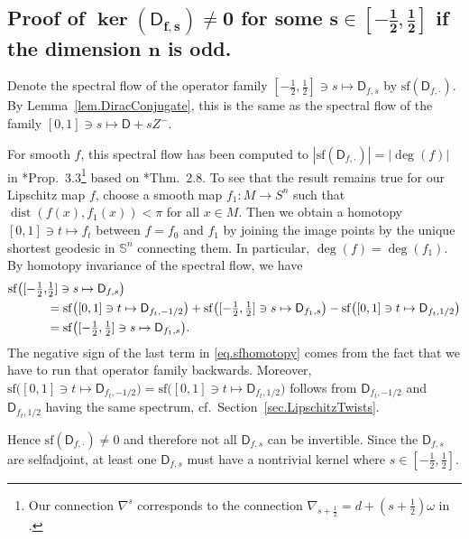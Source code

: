 \documentclass[11pt,reqno]{amsart}
\newcommand{\ns}{\nabla^s}
\renewcommand{\sf}{\mathrm{sf}}
\newcommand{\Sn}{\mathbb{S}^n}
\newcommand{\D}{\mathsf{D}}
\newcommand{\<}{\langle}
\renewcommand{\>}{\rangle}
\DeclareMathOperator{\dist}{\mathrm{dist}}
\theoremstyle{definition}
\begin{document}
\subsection{\texorpdfstring{Proof of $\boldsymbol{\ker(\D_{f,s})\ne0}$ for some $\boldsymbol{s\in[-\frac12,\frac12]}$ if the dimension $\boldsymbol{n}$ is odd.}{Proof of ker(Df,s)≠0 for some s∈[-½,½] if the dimension n is odd}}
\label{subsec.proof.spectralflow}
Denote the spectral flow of the operator family $[-\frac12,\frac12]\ni s\mapsto \D_{f,s}$ by $\sf(\D_{f,\cdot})$.
By Lemma~\ref{lem.DiracConjugate}, this is the same as the spectral flow of the family $[0,1]\ni s\mapsto \D + sZ^-$.

For smooth $f$, this spectral flow has been computed to $|\sf(\D_{f,\cdot})|=|\deg(f)|$ in \cite{LSW}*{Prop.~3.3}\footnote{Our connection $\ns$ corresponds to the connection $\nabla_{s+\frac12}=d+(s+\frac12)\omega$ in \cite{LSW}.} based on \cite{G}*{Thm.~2.8}.
To see that the result remains true for our Lipschitz map $f$, choose a smooth map $f_1\colon M\to S^n$ such that $\dist(f(x),f_1(x))<\pi$ for all $x\in M$.
Then we obtain a homotopy $[0,1]\ni t\mapsto f_t$ between $f=f_0$ and $f_1$ by joining the image points by the unique shortest geodesic in $\Sn$ connecting them.
In particular, $\deg(f)=\deg(f_1)$.
By homotopy invariance of the spectral flow, we have
\begin{align}
\sf\big([-\tfrac{1}{2},&\tfrac12]\ni s \mapsto \D_{f,s}\big) \notag\\
&=
\sf\big([0,1]\ni t\mapsto \D_{f_t,-1/2}\big)
+ \sf\big([-\tfrac{1}{2},\tfrac12]\ni s\mapsto \D_{f_1,s}\big)
- \sf\big([0,1]\ni t\mapsto \D_{f_t,1/2}\big) \label{eq.sfhomotopy}\\
&=
\sf\big([-\tfrac{1}{2},\tfrac12]\ni s\mapsto \D_{f_1,s}\big) . \notag
\end{align}
The negative sign of the last term in \eqref{eq.sfhomotopy} comes from the fact that we have to run that operator family backwards.
Moreover, $\sf\big([0,1]\ni t\mapsto \D_{f_t,-1/2}\big)=\sf\big([0,1]\ni t\mapsto \D_{f_t,1/2}\big)$ follows from $\D_{f_t,-1/2}$ and $\D_{f_t,1/2}$ having the same spectrum, cf.\ Section~\ref{sec.LipschitzTwists}.

Hence $\sf(\D_{f,\cdot})\neq0$ and therefore not all $\D_{f,s}$ can be invertible. 
Since the $\D_{f,s}$ are selfadjoint, at least one $\D_{f,s}$ must have a nontrivial kernel where $s\in[-\frac12,\frac12]$.
\end{document}
